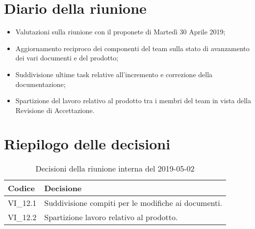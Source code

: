\section{Diario della riunione}
\begin{itemize}
	\item Valutazioni sulla riunione con il proponete di Martedì 30 Aprile 2019;
	\item Aggiornamento reciproco dei componenti del team sulla stato di 
	avanzamento dei vari documenti e del prodotto;
	\item Suddivisione ultime task relative all'incremento e correzione della 
	documentazione;
	\item Spartizione del lavoro relativo al prodotto tra i membri del team in 
	vista della Revisione di Accettazione.
	
\end{itemize}

\hspace{3cm}

\section{Riepilogo delle decisioni}

	
	\begin{longtable}{ >{\centering}p{} >{}p{}}
		\caption{Decisioni della riunione interna del 2019-05-02}\\	
		\rowcolorhead
		\textbf{\color{white}Codice} 
		& \centering\textbf{\color{white}Decisione} 
		\tabularnewline 
		\endfirsthead
		VI\_12.1 & Suddivisione compiti per le modifiche ai documenti.
		\tabularnewline 
		VI\_12.2 & Spartizione lavoro relativo al prodotto.	
	\end{longtable}
	





